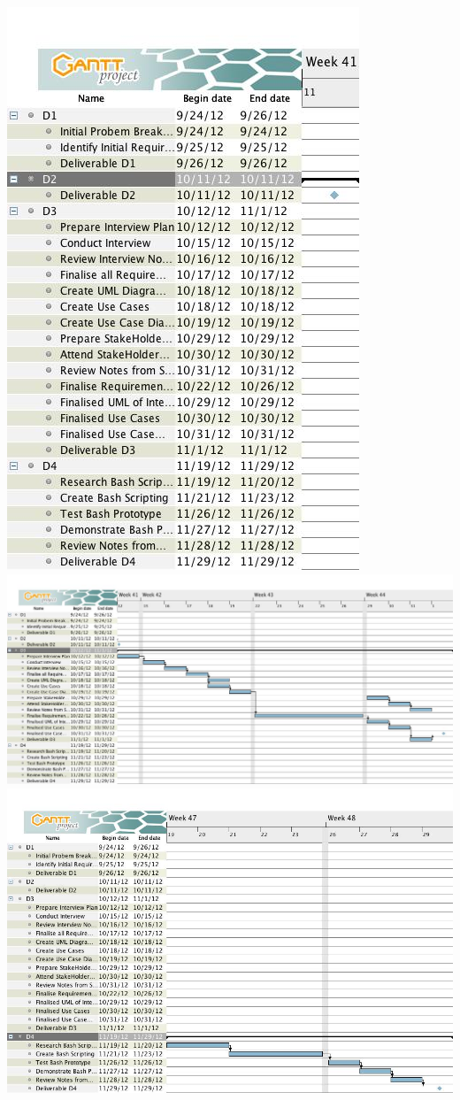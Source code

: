 \documentclass{l3deliverable}
\begin{document}
{\includegraphics[scale=0.7]{img/GANTT D2.jpg}\\
\includegraphics[scale=0.3]{img/GANTT D3.jpg}\\
\includegraphics[scale=0.5]{img/GANTT D4.jpg}\\



}
\end{document}
